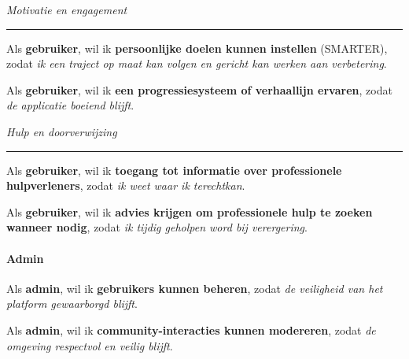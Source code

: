 \textit{Motivatie en engagement}
\hrule
\vspace{1em}

Als \textbf{gebruiker}, \newline
wil ik \textbf{persoonlijke doelen kunnen instellen} (SMARTER), \newline
zodat \textit{ik een traject op maat kan volgen en gericht kan werken aan verbetering}.

\vspace{1em}

Als \textbf{gebruiker}, \newline
wil ik \textbf{een progressiesysteem of verhaallijn ervaren}, \newline
zodat \textit{de applicatie boeiend blijft}.

\vspace{1em}
\vspace{1em}

\textit{Hulp en doorverwijzing}
\hrule
\vspace{1em}

Als \textbf{gebruiker}, \newline
wil ik \textbf{toegang tot informatie over professionele hulpverleners}, \newline
zodat \textit{ik weet waar ik terechtkan}.

\vspace{1em}

Als \textbf{gebruiker}, \newline
wil ik \textbf{advies krijgen om professionele hulp te zoeken wanneer nodig}, \newline
zodat \textit{ik tijdig geholpen word bij verergering}.

\vspace{1em}

\paragraph{Admin}

\vspace{1em}

Als \textbf{admin}, \newline
wil ik \textbf{gebruikers kunnen beheren}, \newline
zodat \textit{de veiligheid van het platform gewaarborgd blijft}.

\vspace{1em}

Als \textbf{admin}, \newline
wil ik \textbf{community-interacties kunnen modereren}, \newline
zodat \textit{de omgeving respectvol en veilig blijft}.

